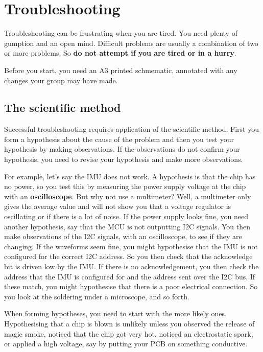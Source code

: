 \chapter{Troubleshooting}
\label{troubleshooting}

Troubleshooting can be frustrating when you are tired. You need plenty
of gumption and an open mind. Difficult problems are usually a
combination of two or more problems. So \textbf{do not attempt if you
  are tired or in a hurry}.

Before you start, you need an A3 printed schmematic, annotated with
any changes your group may have made.


\section{The scientific method}

Successful troubleshooting requires application of the scientific
method.  First you form a hypothesis about the cause of the problem
and then you test your hypothesis by making observations.  If the
observations do not confirm your hypothesis, you need to revise your
hypothesis and make more observations.

For example, let's say the IMU does not work.  A hypothesis is that
the chip has no power, so you test this by measuring the power supply
voltage at the chip with an \textbf{oscilloscope}.  But why not use a
multimeter?  Well, a multimeter only gives the average value and will
not show you that a voltage regulator is oscillating or if there is a
lot of noise.  If the power supply looks fine, you need another
hypothesis, say that the MCU is not outputting I2C signals.  You then
make observations of the I2C signals, with an oscilloscope, to see if
they are changing.  If the waveforms seem fine, you might hypothesise
that the IMU is not configured for the correct I2C address.  So you
then check that the acknowledge bit is driven low by the IMU.  If
there is no acknowledgement, you then check the address that the IMU
is configured for and the address sent over the I2C bus.  If these
match, you might hypothesise that there is a poor electrical
connection.  So you look at the soldering under a microscope, and so
forth.

When forming hypotheses, you need to start with the more likely ones.
Hypothesising that a chip is blown is unlikely unless you observed the
release of magic smoke, noticed that the chip got very hot, noticed an
electrostatic spark, or applied a high voltage, say by putting your
PCB on something conductive.

